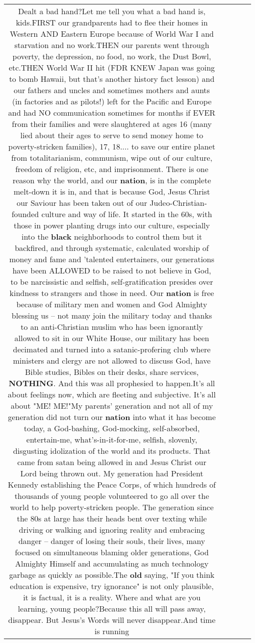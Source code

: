 \documentclass[11pt]{article}
\newlength\mylength
\begin{document}
\begin{center}
\begin{longtable}{|C{.65\mylength}|C{.30\mylength}|C{.12\mylength}|C{.12\mylength}|C{.12\mylength}|}
  \small Dealt a bad hand?Let me tell you what a bad hand is, kids.FIRST our grandparents had to flee their homes in Western AND Eastern Europe because of World War I and starvation and no work.THEN our parents went through poverty, the depression, no food, no work, the Dust Bowl, etc.THEN World War II hit (FDR KNEW Japan was going to bomb Hawaii, but that's another history fact lesson) and our fathers and uncles and sometimes mothers and aunts (in factories and as pilots!) left for the Pacific and Europe and had NO communication sometimes for months if EVER from their families and were slaughtered at ages 16 (many lied about their ages to serve to send money home to poverty-stricken families), 17, 18.... to save our entire planet from totalitarianism, communism, wipe out of our culture, freedom of religion, etc, and imprisonment.  There is one reason why the world, and our \textbf{nation}, is in the complete melt-down it is in, and that is because God, Jesus Christ our Saviour has been taken out of our Judeo-Christian-founded culture and way of life. It started in the 60s, with those in power planting drugs into our culture, especially into the \textbf{black} neighborhoods to control them but it backfired, and through systematic, calculated worship of money and fame and 'talented entertainers, our generations have been ALLOWED to be raised to not believe in God, to be narcissistic and selfish, self-gratification presides over kindness to strangers and those in need. Our \textbf{nation} is free because of military men and women and God Almighty blessing us -- not many join the military today and thanks to an anti-Christian muslim who has been ignorantly allowed to sit in our White House, our military has been decimated and turned into a satanic-profering club where ministers and clergy are not allowed to discuss God, have Bible studies, Bibles on their desks, share services, \textbf{NOTHING}.  And this was all prophesied to happen.It's all about feelings now, which are fleeting and subjective. It's all about "ME! ME!"My parents' generation and not all of my generation did not turn our \textbf{nation} into what it has become today, a God-bashing, God-mocking, self-absorbed, entertain-me, what's-in-it-for-me, selfish, slovenly, disgusting idolization of the world and its products. That came from satan being allowed in and Jesus Christ our Lord being thrown out.  My generation had President Kennedy establishing the Peace Corps, of which hundreds of thousands of young people volunteered to go all over the world to help poverty-stricken people.  The generation since the 80s at large has their heads bent over texting while driving or walking and ignoring reality and embracing danger -- danger of losing their souls, their lives, many focused on simultaneous blaming older generations, God Almighty Himself and accumulating as much technology garbage as quickly as possible.The \textbf{old} saying, "If you think education is expensive, try ignorance" is not only plausible, it is factual, it is a reality. Where and what are you learning, young people?Because this all will pass away, disappear.  But Jesus's Words will never disappear.And time is running 
\end{longtable}
\end{center}
\end{document}
